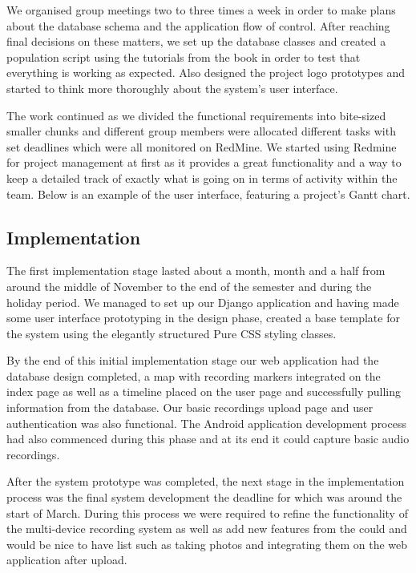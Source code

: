 \documentclass{l3proj}
\begin{document}
We organised group meetings two to three times a week in order to make plans about the database schema and the application flow of control. After reaching final decisions on these matters, we set up the database classes and created a population script using the tutorials from the book in order to test that everything is working as expected. Also designed the project logo prototypes and started to think more thoroughly about the system's user interface.

The work continued as we divided the functional requirements into bite-sized smaller chunks and different group members were allocated different tasks with set deadlines which were all monitored on RedMine. We started using Redmine for project management at first as it provides a great functionality and a way to keep a detailed track of exactly what is going on in terms of activity within the team. Below is an example of the user interface, featuring a project's Gantt chart.


\subsection{Implementation}

The first implementation stage lasted about a month, month and a half from around the middle of November to the end of the semester and during the holiday period.
 We managed to set up our Django application and having made some user interface prototyping in the design phase, created a base template for the system using the elegantly structured Pure CSS styling classes.

By the end of this initial implementation stage our web application had the database design completed, a map with recording markers integrated on the index page as well as a timeline placed on the user page and successfully pulling information from the database.
 Our basic recordings upload page and user authentication was also functional. The Android application development process had also commenced during this phase and at its end it could capture basic audio recordings.

After the system prototype was completed, the next stage in the implementation process was the final system development the deadline for which was around the start of March.
 During this process we were required to refine the functionality of the multi-device recording system as well as add new features
 from the could and would be nice to have list such as taking photos and integrating them on the web application after upload.
\end{document}
